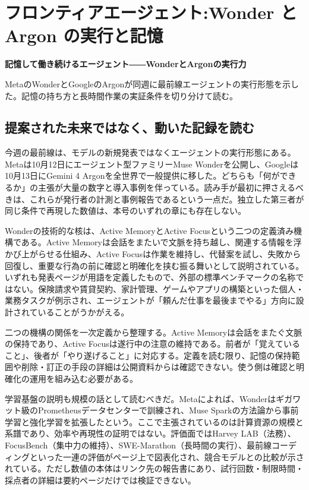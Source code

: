 \documentclass[lualatex,a4paper,10pt]{jlreq}
\begin{document}
\surveycover
\clearpage
\twocolumn
\section{フロンティアエージェント:Wonder と Argon の実行と記憶}
\label{sec:P1}

{\Large\bfseries 記憶して働き続けるエージェント――WonderとArgonの実行力\par}
\smallskip
{\color{SurveyMuted}MetaのWonderとGoogleのArgonが同週に最前線エージェントの実行形態を示した。記憶の持ち方と長時間作業の実証条件を切り分けて読む。\par}
\bigskip

\subsection*{提案された未来ではなく、動いた記録を読む}

今週の最前線は、モデルの新規発表ではなくエージェントの実行形態にある。Metaは10月12日にエージェント型ファミリーMuse Wonderを公開し、Googleは10月13日にGemini 4 Argonを全世界で一般提供に移した。どちらも「何ができるか」の主張が大量の数字と導入事例を伴っている。読み手が最初に押さえるべきは、これらが発行者の計測と事例報告であるという一点だ。独立した第三者が同じ条件で再現した数値は、本号のいずれの章にも存在しない。
\cite{B01,B02,B03,B04,B05,B06,B07,B08}


Wonderの技術的な核は、Active MemoryとActive Focusという二つの定義済み機構である。Active Memoryは会話をまたいで文脈を持ち越し、関連する情報を浮かび上がらせる仕組み、Active Focusは作業を維持し、代替案を試し、失敗から回復し、重要な行為の前に確認と明確化を挟む振る舞いとして説明されている。いずれも発表ページが用語を定義したもので、外部の標準ベンチマークの名称ではない。保険請求や賃貸契約、家計管理、ゲームやアプリの構築といった個人・業務タスクが例示され、エージェントが「頼んだ仕事を最後までやる」方向に設計されていることがうかがえる。
\cite{B01,B04,B07}


二つの機構の関係を一次定義から整理する。Active Memoryは会話をまたぐ文脈の保持であり、Active Focusは遂行中の注意の維持である。前者が「覚えていること」、後者が「やり遂げること」に対応する。定義を読む限り、記憶の保持範囲や削除・訂正の手段の詳細は公開資料からは確認できない。使う側は確認と明確化の運用を組み込む必要がある。
\cite{B01,B04,B07}


学習基盤の説明も規模の話として読むべきだ。Metaによれば、Wonderはギガワット級のPrometheusデータセンターで訓練され、Muse Sparkの方法論から事前学習と強化学習を拡張したという。ここで主張されているのは計算資源の規模と系譜であり、効率や再現性の証明ではない。評価面ではHarvey LAB（法務）、FocusBench（集中力の維持）、SWE-Marathon（長時間の実行）、最前線コーディングといった一連の評価がページ上で図表化され、競合モデルとの比較が示されている。ただし数値の本体はリンク先の報告書にあり、試行回数・制限時間・採点者の詳細は要約ページだけでは検証できない。
\cite{B01,B04,B07}
\end{document}
